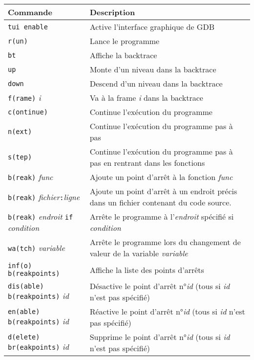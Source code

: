 \begin{table}[H]
	\centering
	\begin{tabular}{lp{9cm}}
		\toprule

		\textbf{Commande} & \textbf{Description}\\

		\midrule

		\texttt{tui enable} & Active l'interface graphique de GDB\\
		\texttt{r(un)} & Lance le programme\\

		\midrule

		\texttt{bt} & Affiche la backtrace\\
		\texttt{up} & Monte d'un niveau dans la backtrace\\
		\texttt{down} & Descend d'un niveau dans la backtrace\\
		\texttt{f(rame)} \textit{i} & Va à la frame \textit{i} dans
			la backtrace\\

		\midrule

		\texttt{c(ontinue)} & Continue l'exécution du programme\\
		\texttt{n(ext)} & Continue l'exécution du programme pas à pas\\
		\texttt{s(tep)} & Continue l'exécution du programme pas à pas en
			rentrant dans les fonctions\\

		\midrule

		\texttt{b(reak)} \textit{func} & Ajoute un point d'arrêt à la
			fonction \textit{func}\\
		\texttt{b(reak)} \textit{fichier}\texttt{:}\textit{ligne} & Ajoute
			un point d'arrêt à un endroit précis dans un fichier
			contenant du code source.\\
		\texttt{b(reak)} \textit{endroit} \texttt{if} \textit{condition} &
			Arrête le programme à l'\textit{endroit} spécifié si
			\textit{condition}\\
		\texttt{wa(tch)} \textit{variable} & Arrête le programme lors du
			changement de valeur de la variable \textit{variable}\\

		\midrule

		\texttt{inf(o) b(reakpoints)} & Affiche la liste des points d'arrêts\\
		\texttt{dis(able) b(reakpoints)} \textit{id} & Désactive le
			point d'arrêt n°\textit{id} (tous si \textit{id} n'est
			pas spécifié)\\
		\texttt{en(able) b(reakpoints)} \textit{id} & Réactive le
			point d'arrêt n°\textit{id} (tous si \textit{id} n'est
			pas spécifié)\\
		\texttt{d(elete) br(eakpoints)} \textit{id} & Supprime le
			point d'arrêt n°\textit{id} (tous si \textit{id} n'est
			pas spécifié)\\


\end{tabular}
\end{table}
